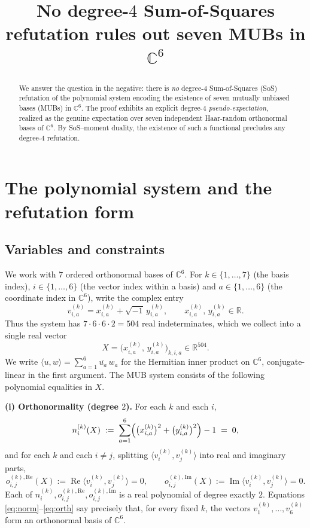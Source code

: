 \documentclass{amsart}
\theoremstyle{definition}
\begin{document}
\title{No degree-$4$ Sum-of-Squares refutation rules out seven MUBs in $\mathbb{C}^6$}
\maketitle

\begin{abstract}
We answer the question in the negative: there is \emph{no} degree-$4$ Sum-of-Squares
(SoS) refutation of the polynomial system encoding the existence of seven mutually
unbiased bases (MUBs) in $\mathbb{C}^6$. The proof exhibits an explicit degree-$4$
\emph{pseudo-expectation}, realized as the genuine expectation over seven independent
Haar-random orthonormal bases of $\mathbb{C}^6$. By SoS--moment duality, the existence of
such a functional precludes any degree-$4$ refutation.
\end{abstract}

\section{The polynomial system and the refutation form}\label{sec:setup}

\subsection{Variables and constraints}
We work with $7$ ordered orthonormal bases of $\mathbb{C}^6$. For $k\in\{1,\dots,7\}$
(the basis index), $i\in\{1,\dots,6\}$ (the vector index within a basis) and
$a\in\{1,\dots,6\}$ (the coordinate index in $\mathbb{C}^6$), write the complex entry
\[
v^{(k)}_{i,a}=x^{(k)}_{i,a}+\sqrt{-1}\,y^{(k)}_{i,a},
\qquad x^{(k)}_{i,a},\,y^{(k)}_{i,a}\in\mathbb{R}.
\]
Thus the system has $7\cdot 6\cdot 6\cdot 2 = 504$ real indeterminates, which we collect
into a single real vector
\[
X=\bigl(x^{(k)}_{i,a},\,y^{(k)}_{i,a}\bigr)_{k,i,a}\in\mathbb{R}^{504}.
\]
We write $\langle u,w\rangle=\sum_{a=1}^{6}\overline{u_a}\,w_a$ for the Hermitian inner
product on $\mathbb{C}^6$, conjugate-linear in the first argument. The MUB system consists
of the following polynomial equalities in $X$.

\medskip
\noindent\textbf{(i) Orthonormality (degree $2$).} For each $k$ and each $i$,
\begin{equation}\label{eq:norm}
n^{(k)}_{i}(X)\;:=\;\sum_{a=1}^{6}\Bigl(\bigl(x^{(k)}_{i,a}\bigr)^2+\bigl(y^{(k)}_{i,a}\bigr)^2\Bigr)-1\;=\;0,
\end{equation}
and for each $k$ and each $i\ne j$, splitting $\langle v^{(k)}_i,v^{(k)}_j\rangle$ into real
and imaginary parts,
\begin{equation}\label{eq:orth}
o^{(k),\mathrm{Re}}_{i,j}(X):=\operatorname{Re}\langle v^{(k)}_i,v^{(k)}_j\rangle=0,
\qquad
o^{(k),\mathrm{Im}}_{i,j}(X):=\operatorname{Im}\langle v^{(k)}_i,v^{(k)}_j\rangle=0 .
\end{equation}
Each of $n^{(k)}_i,o^{(k),\mathrm{Re}}_{i,j},o^{(k),\mathrm{Im}}_{i,j}$ is a real polynomial
of degree exactly $2$. Equations \eqref{eq:norm}--\eqref{eq:orth} say precisely that, for
every fixed $k$, the vectors $v^{(k)}_1,\dots,v^{(k)}_6$ form an orthonormal basis of
$\mathbb{C}^6$.
\end{document}
